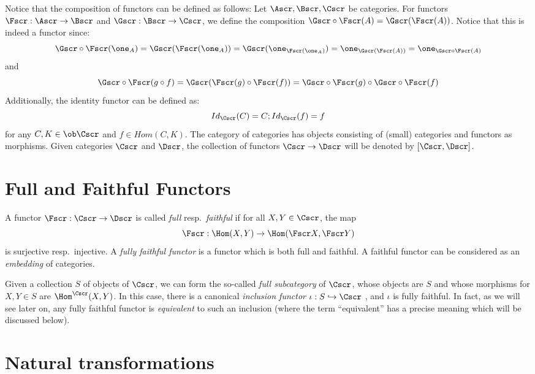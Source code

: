 \begin{example}
  Notice that the composition of functors can be defined as follows:
  Let $\Ascr,\Bscr,\Cscr$ be categories. 
  For functors $\Fscr : \Ascr \to \Bscr$ and $\Gscr : \Bscr \to \Cscr$, we define the composition $\Gscr\circ\Fscr(A)=\Gscr(\Fscr(A))$.
  Notice that this is indeed a functor since: 
  \[\Gscr\circ\Fscr(\one_A)=\Gscr(\Fscr(\one_A))=\Gscr(\one_{\Fscr(\one_A)})=\one_{\Gscr(\Fscr(A))}=\one_{\Gscr\circ\Fscr(A)}\]
  and 
  \[\Gscr\circ\Fscr(g\circ f)=\Gscr(\Fscr(g)\circ\Fscr(f))=\Gscr\circ\Fscr(g)\circ \Gscr\circ\Fscr(f)\]
  Additionally, the identity functor can be defined as:
  \[Id_\Cscr(C)=C; Id_\Cscr(f)=f\]
  for any $C,K \in \ob\Cscr$ and $f\in Hom(C,K)$.
  The category of categories has objects consisting of (small) categories and functors as morphisms.
  Given categories $\Cscr$ and $\Dscr$, the collection of functors $\Cscr \to \Dscr$ will be denoted by $[\Cscr,\Dscr]$.
\end{example}

\section{Full and Faithful Functors}

A functor $\Fscr : \Cscr \to \Dscr$ is called \emph{full} resp.~\emph{faithful} if for all $X,Y \in \Cscr$, the map
\[ \Fscr : \Hom(X,Y) \to \Hom(\Fscr X, \Fscr Y) \]
is surjective resp.~injective.
A \emph{fully faithful functor} is a functor which is both full and faithful.
A faithful functor can be considered as an \emph{embedding} of categories.

Given a collection $S$ of objects of $\Cscr$, we can form the so-called \emph{full subcategory} of $\Cscr$, whose objects are $S$ and whose morphisms for $X,Y \in S$ are $\Hom^{\Cscr}(X,Y)$.
In this case, there is a canonical \emph{inclusion functor} $\iota : S \hookrightarrow \Cscr$ , and $\iota$ is fully faithful.
In fact, as we will see later on, any fully faithful functor is \emph{equivalent} to such an inclusion (where the term ``equivalent'' has a precise meaning which will be discussed below).

\section{Natural transformations}

